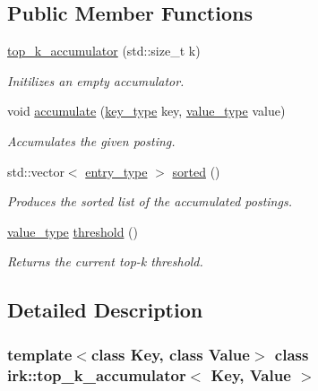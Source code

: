 \subsection*{Public Member Functions}
\begin{DoxyCompactItemize}
\item 
\mbox{\hyperlink{classirk_1_1top__k__accumulator_a729944f89ec6c2085be96ad23ae9a727}{top\+\_\+k\+\_\+accumulator}} (std\+::size\+\_\+t k)
\begin{DoxyCompactList}\small\item\em Initilizes an empty accumulator. \end{DoxyCompactList}\item 
void \mbox{\hyperlink{classirk_1_1top__k__accumulator_ae02e391e9bab8ce26fb9f5c7473a26d5}{accumulate}} (\mbox{\hyperlink{classirk_1_1top__k__accumulator_a2476f5b995fe252f092590c05f48e61f}{key\+\_\+type}} key, \mbox{\hyperlink{classirk_1_1top__k__accumulator_ad96657e9478dcbab995f3bf38954b5bd}{value\+\_\+type}} value)
\begin{DoxyCompactList}\small\item\em Accumulates the given posting. \end{DoxyCompactList}\item 
std\+::vector$<$ \mbox{\hyperlink{classirk_1_1top__k__accumulator_a0eacc4cbf280b54983e25b9d34bd91c0}{entry\+\_\+type}} $>$ \mbox{\hyperlink{classirk_1_1top__k__accumulator_a8655daf7599408d45f9ee1be82d0c0a5}{sorted}} ()
\begin{DoxyCompactList}\small\item\em Produces the sorted list of the accumulated postings. \end{DoxyCompactList}\item 
\mbox{\hyperlink{classirk_1_1top__k__accumulator_ad96657e9478dcbab995f3bf38954b5bd}{value\+\_\+type}} \mbox{\hyperlink{classirk_1_1top__k__accumulator_a70f24ee6364940d0ea95cb6aa9eca510}{threshold}} ()
\begin{DoxyCompactList}\small\item\em Returns the current top-\/k threshold. \end{DoxyCompactList}\end{DoxyCompactItemize}


\subsection{Detailed Description}
\subsubsection*{template$<$class Key, class Value$>$\newline
class irk\+::top\+\_\+k\+\_\+accumulator$<$ Key, Value $>$}


